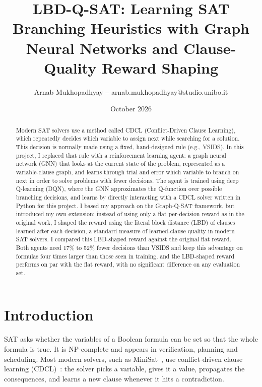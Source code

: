 \documentclass[11pt,a4paper]{article}
\title{LBD-Q-SAT: Learning SAT Branching Heuristics with Graph Neural Networks and Clause-Quality Reward Shaping}
\author{Arnab Mukhopadhyay -- arnab.mukhopadhyay@studio.unibo.it}
\date{October 2026}
\begin{document}
\maketitle

\begin{abstract}
Modern SAT solvers use a method called CDCL (Conflict-Driven Clause Learning), which repeatedly decides which variable to assign next while searching for a solution. This decision is normally made using a fixed, hand-designed rule (e.g., VSIDS). In this project, I replaced that rule with a reinforcement learning agent: a graph neural network (GNN) that looks at the current state of the problem, represented as a variable-clause graph, and learns through trial and error which variable to branch on next in order to solve problems with fewer decisions. The agent is trained using deep Q-learning (DQN), where the GNN approximates the Q-function over possible branching decisions, and learns by directly interacting with a CDCL solver written in Python for this project. I based my approach on the Graph-Q-SAT framework, but introduced my own extension: instead of using only a flat per-decision reward as in the original work, I shaped the reward using the literal block distance (LBD) of clauses learned after each decision, a standard measure of learned-clause quality in modern SAT solvers. I compared this LBD-shaped reward against the original flat reward. Both agents need 17\% to 52\% fewer decisions than VSIDS and keep this advantage on formulas four times larger than those seen in training, and the LBD-shaped reward performs on par with the flat reward, with no significant difference on any evaluation set.
\end{abstract}

\tableofcontents
\newpage

\section{Introduction}
\label{sec:intro}

SAT asks whether the variables of a Boolean formula can be set so that the whole formula is true. It is NP-complete and appears in verification, planning and scheduling. Most modern solvers, such as MiniSat~\cite{een2003minisat}, use conflict-driven clause learning (CDCL)~\cite{marques1999grasp}: the solver picks a variable, gives it a value, propagates the consequences, and learns a new clause whenever it hits a contradiction.
\end{document}
